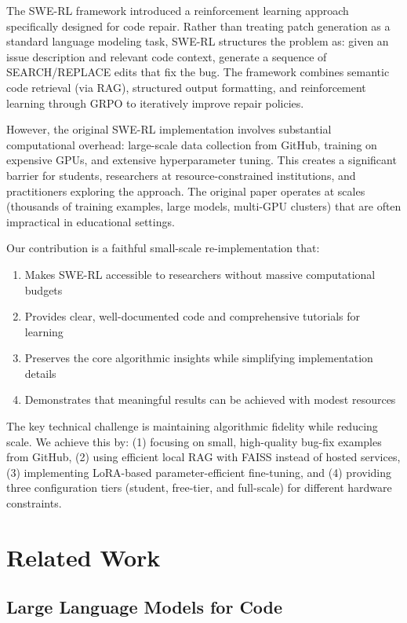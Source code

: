\documentclass{article} %
\begin{document}
The SWE-RL framework \citep{swerl2025} introduced a reinforcement learning approach specifically designed for code repair. Rather than treating patch generation as a standard language modeling task, SWE-RL structures the problem as: given an issue description and relevant code context, generate a sequence of SEARCH/REPLACE edits that fix the bug. The framework combines semantic code retrieval (via RAG), structured output formatting, and reinforcement learning through GRPO to iteratively improve repair policies.

However, the original SWE-RL implementation involves substantial computational overhead: large-scale data collection from GitHub, training on expensive GPUs, and extensive hyperparameter tuning. This creates a significant barrier for students, researchers at resource-constrained institutions, and practitioners exploring the approach. The original paper operates at scales (thousands of training examples, large models, multi-GPU clusters) that are often impractical in educational settings.

Our contribution is a faithful small-scale re-implementation that:
\begin{enumerate}
    \item Makes SWE-RL accessible to researchers without massive computational budgets
    \item Provides clear, well-documented code and comprehensive tutorials for learning
    \item Preserves the core algorithmic insights while simplifying implementation details
    \item Demonstrates that meaningful results can be achieved with modest resources
\end{enumerate}

The key technical challenge is maintaining algorithmic fidelity while reducing scale. We achieve this by: (1) focusing on small, high-quality bug-fix examples from GitHub, (2) using efficient local RAG with FAISS instead of hosted services, (3) implementing LoRA-based parameter-efficient fine-tuning, and (4) providing three configuration tiers (student, free-tier, and full-scale) for different hardware constraints.

\section{Related Work}

\subsection{Large Language Models for Code}
\end{document}
